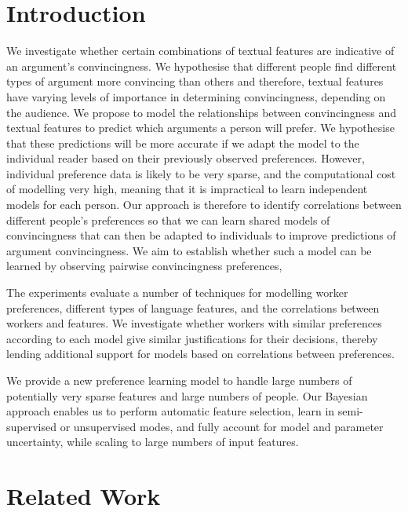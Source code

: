 \section{Introduction}\label{sec:intro}

We investigate whether certain combinations of textual features are indicative of an argument's convincingness.
We hypothesise that different people find different types of argument more convincing than others and therefore, textual features have varying levels of importance in determining convincingness, depending on the audience. 
We propose to model the relationships between convincingness and textual features to predict which arguments a person will prefer.
We hypothesise that these predictions will be more accurate if we adapt the model to the individual reader based on their previously observed preferences. 
However, individual preference data is likely to be very sparse, 
and the computational cost of modelling very high, 
meaning that it is impractical to learn independent models for each person.
Our approach is therefore to identify correlations between different people's preferences
so that we can learn shared models of convincingness that can then be adapted to individuals to improve predictions of argument convincingness. 
We aim to establish whether such a model can be learned by observing pairwise convincingness preferences, 

The experiments evaluate a number of techniques for modelling worker preferences, different types of language features, and the correlations between workers and features. 
We investigate whether workers with similar preferences according to each model give similar justifications for their decisions, thereby lending additional support for models based on correlations between preferences.

We provide a new preference learning model to handle large numbers of potentially very sparse features and large numbers of people. Our Bayesian approach enables us to 
perform automatic feature selection, learn in semi-supervised or unsupervised modes, 
and fully account for model and parameter uncertainty, while scaling to large numbers of input features. 

\section{Related Work}\label{sec:related}


